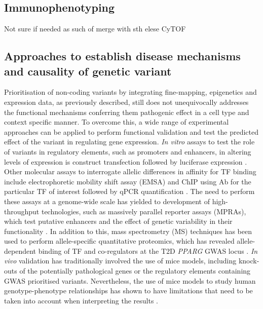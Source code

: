 
\subsection{Immunophenotyping}
Not sure if needed as such of merge with sth elese
CyTOF

\subsection{Approaches to establish disease mechanisms and causality of genetic variant}
Prioritisation of non-coding variants by integrating fine-mapping, epigenetics and expression data, as previously described, still does not unequivocally addresses the functional mechanisms conferring them pathogenic effect in a cell type and context specific manner. To overcome this, a wide range of experimental approaches can be applied to perform functional validation and test the predicted effect of the variant in regulating gene expression. 
\textit{In vitro} assays to test the role of variants in regulatory elements, such as promoters and enhancers, in altering levels of expression is construct transfection followed by luciferase expression \parencite{Niimi2002}. Other molecular assays to interrogate allelic differences in affinity for TF binding include electrophoretic mobility shift assay (EMSA) and ChIP using Ab for the particular TF of interest followed by qPCR quantification \parencite{Vernes2007}. The need to perform these assays at a genome-wide scale has yielded to development of high-throughput technologies, such as massively parallel reporter assays (MPRAs), which test putative enhancers and the effect of genetic variability in their functionality \parencite{Kheradpour2013}. In addition to this, mass spectrometry (MS) techniques has been used to perform allele-specific quantitative proteomics, which has revealed allele-dependent binding of TF and co-regulators at the T2D \textit{PPARG} GWAS locus \parencite{Lee2017}. \textit{In vivo} validation has traditionally involved the use of mice models, including knock-outs of the potentially pathological genes or the regulatory elements containing GWAS prioritised variants. Nevertheless, the use of mice models to study human genotype-phenotype relationships has shown to have limitations that need to be taken into account when interpreting the results \parencite{Ermann2012}. 

